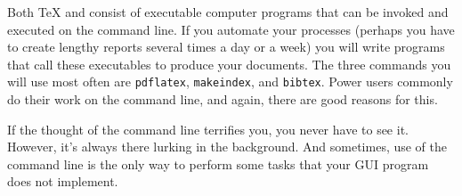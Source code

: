     Both \TeX{} and \Lx{} consist of executable computer programs that can be invoked and executed on the command line. If you automate your processes (perhaps you have to create lengthy reports several times a day or a week) you will write programs that call these executables to produce your documents. The three commands you will use most often are \texttt{pdflatex}, \texttt{makeindex}, and \texttt{bibtex}. Power users commonly do their work on the command line, and again, there are good reasons for this.

    If the thought of the command line terrifies you, you never have to see it. However, it's always there lurking in the background. And sometimes, use of the command line is the only way to perform some tasks that your GUI program does not implement.

